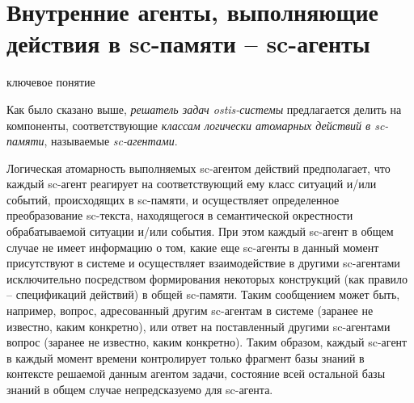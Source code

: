 \section{Внутренние агенты, выполняющие действия в sc-памяти -- sc-агенты}
\label{sec_ps_agents}

\begin{SCn}
\begin{scnrelfromlist}{ключевое понятие}
\end{scnrelfromlist}
\end{SCn}

Как было сказано выше, \textit{решатель задач ostis-системы} предлагается делить на компоненты, соответствующие \textit{классам логически атомарных действий в sc-памяти}, называемые \textit{sc-агентами}.

\begin{SCn}
\end{SCn}

Логическая атомарность выполняемых sc-агентом действий предполагает, что каждый sc-агент реагирует на соответствующий ему класс ситуаций и/или событий, происходящих в sc-памяти, и осуществляет определенное преобразование sc-текста, находящегося в семантической окрестности обрабатываемой ситуации и/или события. При этом каждый sc-агент в общем случае не имеет информацию о том, какие еще sc-агенты в данный момент присутствуют в системе и осуществляет взаимодействие в другими sc-агентами исключительно посредством формирования некоторых конструкций (как правило – спецификаций действий) в общей sc-памяти. Таким сообщением может быть, например, вопрос, адресованный другим sc-агентам в системе (заранее не известно, каким конкретно), или ответ на поставленный другими sc-агентами вопрос (заранее не известно, каким конкретно). Таким образом, каждый sc-агент в каждый момент времени контролирует только фрагмент базы знаний в контексте решаемой данным агентом задачи, состояние всей остальной базы знаний в общем случае непредсказуемо для sc-агента.

